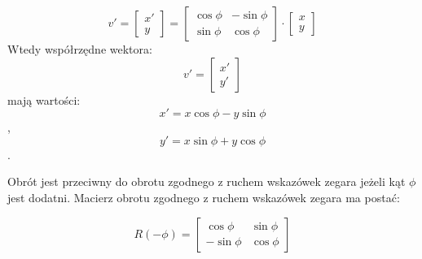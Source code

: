 \begin{equation*}
v' =
    \begin{bmatrix}
    x' \\
    y
    \end{bmatrix}
    =
    \begin{bmatrix}
    \cos\phi & -\sin\phi \\
    \sin\phi & \cos\phi
    \end{bmatrix}
    \cdot
    \begin{bmatrix}
    x \\
    y
    \end{bmatrix}
\end{equation*}
Wtedy współrzędne wektora:  
\begin{equation*}
v' =
    \begin{bmatrix}
     x' \\
     y'
    \end{bmatrix}
\end{equation*}
mają wartości:
\begin{equation*}
    x' = x \cos\phi - y \sin\phi
\end{equation*},
\begin{equation*}
    y' = x \sin\phi + y \cos\phi
\end{equation*}.

Obrót jest przeciwny do obrotu zgodnego z ruchem wskazówek zegara jeżeli kąt $\phi$ jest dodatni. Macierz obrotu zgodnego z ruchem wskazówek zegara ma postać:

\begin{equation*}
    R(-\phi) =
    \begin{bmatrix}
    \cos\phi & \sin\phi \\
    -\sin\phi & \cos\phi
    \end{bmatrix}
\end{equation*}


